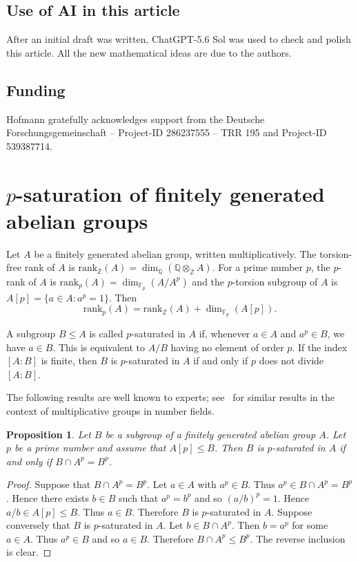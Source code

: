 \documentclass[12pt, a4paper, usenames]{amsart}
\newcommand{\Z}{\mathbb{Z}}
\newcommand{\Q}{\mathbb{Q}}
\newcommand{\F}{\mathbb{F}}
\theoremstyle{plain}
\newtheorem{prop}[theorem]{Proposition}
\theoremstyle{remark}
\theoremstyle{definition}
\newcommand{\rank}{\mathrm{rank}}
\begin{document}
\subsection*{Use of AI in this article}
After an initial draft was written, ChatGPT-5.6 Sol was used to check and polish this article. 
All the new mathematical ideas are due to the authors.

\subsection*{Funding}
Hofmann gratefully acknowledges support from the Deutsche Forschungsgemeinschaft --
Project-ID 286237555 -- TRR 195 and Project-ID 539387714.


\section{$p$-saturation of finitely generated abelian groups}\label{sec:p-sat-fg-ab-groups}
Let $A$ be a finitely generated abelian group, written multiplicatively.
The torsion-free rank of $A$ is $\rank_{\Z}(A) = \dim_\Q(\Q \otimes_{\Z} A)$. 
For a prime number $p$, the $p$-rank of $A$ is 
$\rank_{p}(A) = \dim_{\F_p}(A/A^{p})$ and the $p$-torsion subgroup of $A$ 
is $A[p]=\{ a \in A : a^{p}=1 \}$. Then
\begin{equation}\label{eq:p-rank-vs-Z-rank}
\rank_{p}(A) = \rank_{\Z}(A) + \dim_{\F_{p}}(A[p]).    
\end{equation}

A subgroup $B \leq A$ is called $p$-saturated in $A$ if, whenever $a \in A$ and $a^{p} \in B$, 
we have $a \in B$. 
This is equivalent to $A/B$ having no element of order $p$.
If the index $[A:B]$ is finite, then $B$ is $p$-saturated in $A$
if and only if $p$ does not divide $[A:B]$.

The following results are well known to experts; see~\cite[Lemma~4.3]{MR4440537} for similar results in the context of multiplicative groups in number fields.

\begin{prop}\label{prop:p-sat}
Let $B$ be a subgroup of a finitely generated abelian group $A$.  
Let $p$ be a prime number and assume that $A[p] \leq B$.
Then $B$ is $p$-saturated in $A$ if and only if $B \cap A^{p} = B^{p}$.
\end{prop}

\begin{proof}
Suppose that $B \cap A^{p} = B^{p}$. 
Let $a \in A$ with $a^{p} \in B$. Thus $a^{p} \in B \cap A^{p} = B^{p}$.
Hence there exists $b \in B$ such that $a^{p}=b^{p}$ and so $(a/b)^{p}=1$.
Hence $a/b \in A[p] \leq B$.
Thus $a \in B$. 
Therefore $B$ is $p$-saturated in $A$. 
Suppose conversely that $B$ is $p$-saturated in $A$.
Let $b\in B \cap A^{p}$. 
Then $b=a^{p}$ for some $a \in A$. Thus $a^{p} \in B$ and so $a \in B$. 
Therefore  $B \cap A^{p} \leq B^{p}$. The reverse inclusion is clear. 
\end{proof}
\end{document}
